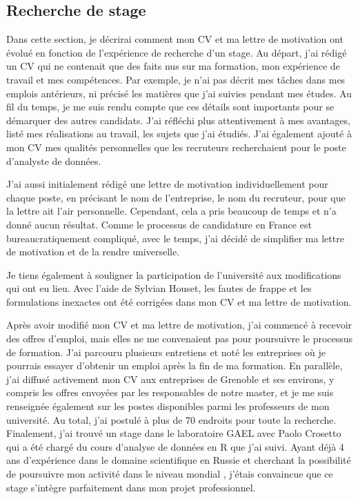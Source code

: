\documentclass[12pt]{article}
\begin{document}
\subsection{Recherche de stage}

Dans cette section, je décrirai comment mon CV et ma lettre de
motivation ont évolué en fonction de l'expérience de recherche d'un
stage. Au départ, j'ai rédigé un CV qui ne contenait que des faits nus
sur ma formation, mon expérience de travail et mes compétences. Par
exemple, je n'ai pas décrit mes tâches dans mes emplois antérieurs, ni
précisé les matières que j'ai suivies pendant mes études. Au fil du
temps, je me suis rendu compte que ces détails sont importants pour se
démarquer des autres candidats. J'ai réfléchi plus attentivement à mes
avantages, listé mes réalisations au travail, les sujets que j'ai
étudiés. J'ai également ajouté à mon CV mes qualités personnelles que
les recruteurs recherchaient pour le poste d'analyste de données.

J'ai aussi initialement rédigé une lettre de motivation individuellement
pour chaque poste, en précisant le nom de l'entreprise, le nom du
recruteur, pour que la lettre ait l'air personnelle. Cependant, cela a
pris beaucoup de temps et n'a donné aucun résultat. Comme le processus
de candidature en France est bureaucratiquement compliqué, avec le
temps, j'ai décidé de simplifier ma lettre de motivation et de la rendre
universelle.

Je tiens également à souligner la participation de l'université aux
modifications qui ont eu lieu. Avec l'aide de Sylvian Houset, les fautes
de frappe et les formulations inexactes ont été corrigées dans mon CV et
ma lettre de motivation.

Après avoir modifié mon CV et ma lettre de motivation, j'ai commencé à
recevoir des offres d'emploi, mais elles ne me convenaient pas pour
poursuivre le processus de formation. J'ai parcouru plusieurs entretiens
et noté les entreprises où je pourrais essayer d'obtenir un emploi après
la fin de ma formation. En parallèle, j'ai diffusé activement mon CV aux
entreprises de Grenoble et ses environs, y compris les offres envoyées
par les responsables de notre master, et je me suis renseignée également
sur les postes disponibles parmi les professeurs de mon université. Au
total, j'ai postulé à plus de 70 endroits pour toute la recherche.
Finalement, j'ai trouvé un stage dans le laboratoire GAEL avec Paolo
Crosetto qui a été chargé du cours d'analyse de données en R que j'ai
suivi. Ayant déjà 4 ans d'expérience dans le domaine scientifique en
Russie et cherchant la possibilité de poursuivre mon activité dans le
niveau mondial , j'étais convaincue que ce stage s'intègre parfaitement
dans mon projet professionnel.
\end{document}
